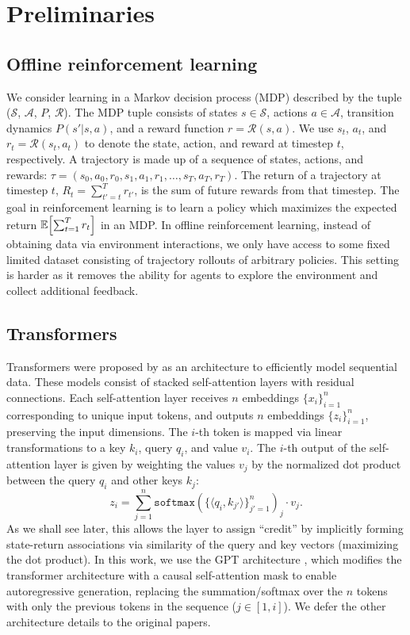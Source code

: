 
\section{Preliminaries}

\subsection{Offline reinforcement learning}
We consider learning in a Markov decision process (MDP) described by the tuple ($\mathcal{S}$, $\mathcal{A}$, $P$, $\mathcal{R}$). The MDP tuple consists of states $s \in \mathcal{S}$, actions $a \in \mathcal{A}$, transition dynamics $P(s'|s,a)$, and a reward function $r = \mathcal{R}(s,a)$. 
We use $s_t$, $a_t$, and $r_t=\mathcal{R}(s_t, a_t)$ to denote the state, action, and reward at timestep $t$, respectively. A trajectory is made up of a sequence of states, actions, and rewards: $\tau = (s_0, a_0, r_0, s_1, a_1, r_1, \ldots, s_T, a_T, r_T)$. The return of a trajectory at timestep $t$, $R_t = \sum_{t'=t}^T r_{t'}$, is the sum of future rewards from that timestep.
The goal in reinforcement learning is to learn a policy which maximizes the expected return $\mathbb{E}\Bigl[\sum_{t=1}^T r_t\Bigr]$ in an MDP.
In offline reinforcement learning, instead of obtaining data via environment interactions, we only have access to some fixed limited dataset consisting of trajectory rollouts of arbitrary policies.
This setting is harder as it removes the ability for agents to explore the environment and collect additional feedback.

\subsection{Transformers}
Transformers were proposed by \citet{vaswani2017attention} as an architecture to efficiently model sequential data.
These models consist of stacked self-attention layers with residual connections.
Each self-attention layer receives $n$ embeddings $\{x_i\}_{i=1}^n$ corresponding to unique input tokens, and outputs $n$ embeddings $\{z_i\}_{i=1}^n$, preserving the input dimensions.
The $i$-th token is mapped via linear transformations to a key $k_i$, query $q_i$, and value $v_i$.
The $i$-th output of the self-attention layer is given by weighting the values $v_j$ by the normalized dot product between the query $q_i$ and other keys $k_j$:
\begin{equation}
    z_i = \sum_{j=1}^n \texttt{softmax}(\{\langle q_i, k_{j'} \rangle\}_{j'=1}^n)_j \cdot v_j.
\end{equation}
As we shall see later, this allows the layer to assign ``credit'' by implicitly forming state-return associations via similarity of the query and key vectors (maximizing the dot product).
In this work, we use the GPT architecture \citep{radford2018gpt}, which modifies the transformer architecture with a causal self-attention mask to enable autoregressive generation, replacing the summation/softmax over the $n$ tokens with only the previous tokens in the sequence ($j \in [1, i]$).
We defer the other architecture details to the original papers.
